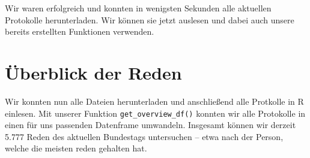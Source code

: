 \documentclass[oneside, 12pt, numbers=endperiod]{scrbook}
\newenvironment{Shaded}{\begin{snugshade}}{\end{snugshade}}
\newcommand{\DataTypeTok}[1]{\textcolor[rgb]{0.13,0.29,0.53}{#1}}
\newcommand{\KeywordTok}[1]{\textcolor[rgb]{0.13,0.29,0.53}{\textbf{#1}}}
\newcommand{\NormalTok}[1]{#1}
\newcommand{\OperatorTok}[1]{\textcolor[rgb]{0.81,0.36,0.00}{\textbf{#1}}}
\newcommand{\OtherTok}[1]{\textcolor[rgb]{0.56,0.35,0.01}{#1}}
\newcommand{\StringTok}[1]{\textcolor[rgb]{0.31,0.60,0.02}{#1}}
\theoremstyle{definition}
\theoremstyle{definition}
\theoremstyle{definition}
\theoremstyle{remark}
\begin{document}
\begin{Shaded}
\end{Shaded}

Wir waren erfolgreich und konnten in wenigsten Sekunden alle aktuellen
Protokolle herunterladen. Wir können sie jetzt auslesen und dabei auch
unsere bereits erstellten Funktionen verwenden.

\begin{Shaded}
\end{Shaded}

\hypertarget{uberblick-der-reden}{%
\section{Überblick der Reden}\label{uberblick-der-reden}}

Wir konnten nun alle Dateien herunterladen und anschließend alle
Protkolle in R einlesen. Mit unserer Funktion
\texttt{get\_overview\_df()} konnten wir alle Protokolle in einen für
uns passenden Datenframe umwandeln. Insgesamt können wir derzeit 5.777
Reden des aktuellen Bundestags untersuchen -- etwa nach der Person,
welche die meisten reden gehalten hat.
\end{document}
